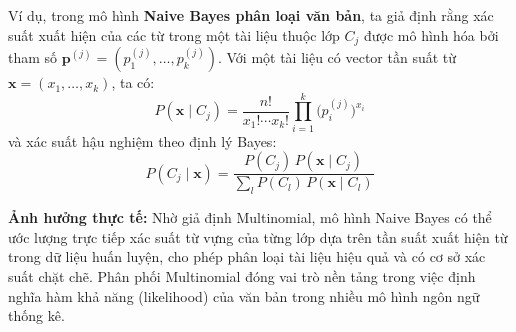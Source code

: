 Ví dụ, trong mô hình \textbf{Naive Bayes phân loại văn bản},  
ta giả định rằng xác suất xuất hiện của các từ trong một tài liệu thuộc lớp $C_j$ được mô hình hóa bởi tham số $\mathbf{p}^{(j)} = (p_1^{(j)}, \dots, p_k^{(j)})$.  
Với một tài liệu có vector tần suất từ $\mathbf{x} = (x_1, \dots, x_k)$,  
ta có:
\[
P(\mathbf{x} \mid C_j) = \frac{n!}{x_1! \cdots x_k!} 
\prod_{i=1}^{k} \big(p_i^{(j)}\big)^{x_i}
\]
và xác suất hậu nghiệm theo định lý Bayes:
\[
P(C_j \mid \mathbf{x}) = \frac{P(C_j) \, P(\mathbf{x} \mid C_j)}{\sum_{l} P(C_l) \, P(\mathbf{x} \mid C_l)}
\]

\textbf{Ảnh hưởng thực tế:}  
Nhờ giả định Multinomial, mô hình Naive Bayes có thể ước lượng trực tiếp 
xác suất từ vựng của từng lớp dựa trên tần suất xuất hiện từ trong dữ liệu huấn luyện,  
cho phép phân loại tài liệu hiệu quả và có cơ sở xác suất chặt chẽ.  
Phân phối Multinomial đóng vai trò nền tảng trong việc định nghĩa hàm khả năng (likelihood) của văn bản trong nhiều mô hình ngôn ngữ thống kê.

